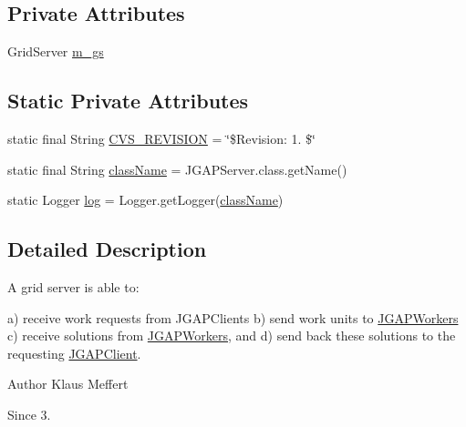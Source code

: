 \subsection*{Private Attributes}
\begin{DoxyCompactItemize}
\item 
Grid\-Server \hyperlink{classorg_1_1jgap_1_1distr_1_1grid_1_1_j_g_a_p_server_a5fe0547d2bcf14f6e7505c1fead8dfea}{m\-\_\-gs}
\end{DoxyCompactItemize}
\subsection*{Static Private Attributes}
\begin{DoxyCompactItemize}
\item 
static final String \hyperlink{classorg_1_1jgap_1_1distr_1_1grid_1_1_j_g_a_p_server_a1934a35759460fe9f868474cc40792b7}{C\-V\-S\-\_\-\-R\-E\-V\-I\-S\-I\-O\-N} = \char`\"{}\$Revision\-: 1. \$\char`\"{}
\item 
static final String \hyperlink{classorg_1_1jgap_1_1distr_1_1grid_1_1_j_g_a_p_server_afb0611e9695ab187b2ec2b96f44000df}{class\-Name} = J\-G\-A\-P\-Server.\-class.\-get\-Name()
\item 
static Logger \hyperlink{classorg_1_1jgap_1_1distr_1_1grid_1_1_j_g_a_p_server_a8e3b3649d3f722e5458907aa0801d91b}{log} = Logger.\-get\-Logger(\hyperlink{classorg_1_1jgap_1_1distr_1_1grid_1_1_j_g_a_p_server_afb0611e9695ab187b2ec2b96f44000df}{class\-Name})
\end{DoxyCompactItemize}


\subsection{Detailed Description}
A grid server is able to\-:

a) receive work requests from J\-G\-A\-P\-Clients b) send work units to \hyperlink{classorg_1_1jgap_1_1distr_1_1grid_1_1_j_g_a_p_workers}{J\-G\-A\-P\-Workers} c) receive solutions from \hyperlink{classorg_1_1jgap_1_1distr_1_1grid_1_1_j_g_a_p_workers}{J\-G\-A\-P\-Workers}, and d) send back these solutions to the requesting \hyperlink{classorg_1_1jgap_1_1distr_1_1grid_1_1_j_g_a_p_client}{J\-G\-A\-P\-Client}.

\begin{DoxyAuthor}{Author}
Klaus Meffert 
\end{DoxyAuthor}
\begin{DoxySince}{Since}
3. 
\end{DoxySince}


